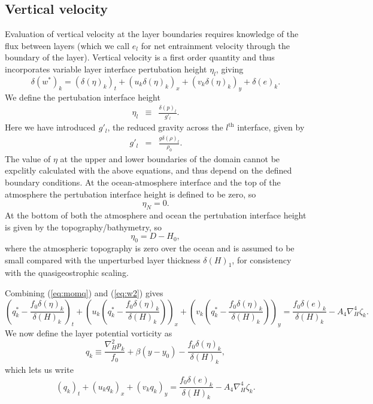 \documentclass[11pt, a4paper,twoside]{article}
\newcommand{\rhb}[1]{{{}^{#1}\rho}}
\newcommand{\gp}[2]{{}^{#1}g'_{#2}}
\numberwithin{equation}{section}
\begin{document}
\subsection{Vertical velocity}
Evaluation of vertical velocity at the layer boundaries requires knowledge of the flux between layers (which we call $e_l$ for net entrainment velocity through the boundary of the layer).
Vertical velocity is a first order quantity and thus incorporates variable layer interface pertubation height $\eta_l$, giving
\begin{equation}\label{eq:w2}
\delta\left(w^*\right)_k =  \left(\delta(\eta)_k\right)_t + \left(u_k \delta(\eta)_k\right)_x + \left(v_{k} \delta(\eta)_k\right)_y + \delta(e)_k.
\end{equation}
We define the pertubation interface height
\begin{eqnarray}
\eta_{l} & \equiv &  \frac{\delta(p)_l}{\gp{}{l}}\label{eq:eta1}.
\end{eqnarray}
Here we have introduced $\gp{}{l}$, the reduced gravity across the $l^\textrm{th}$ interface, given by
\begin{eqnarray}
\gp{}{l}   & = & \frac{g\delta(\rho)_l}{\rhb{}_0}.
\end{eqnarray}
The value of $\eta$ at the upper and lower boundaries of the domain cannot be expclitly calculated with the above equations, and thus depend on the defined boundary conditions.
At the ocean-atmosphere interface and the top of the atmosphere the pertubation interface height is defined to be zero, so
\begin{equation}
\eta_N = 0.
\end{equation}
At the bottom of both the atmosphere and ocean the pertubation interface height is given by the topography/bathymetry, so
\begin{equation}
\eta_0 = D - H_0,
\end{equation}
where the atmospheric topography is zero over the ocean and is assumed to be small compared with the unperturbed layer thickness $\delta(H)_1$, for consistency with the quasigeostrophic scaling.

Combining (\ref{eq:momq}) and (\ref{eq:w2}) gives
\begin{equation}
\left(q^*_k - \frac{f_0\delta(\eta)_k}{\delta(H)_k}\right)_t  + \left(u_k \left(q^*_k - \frac{f_0\delta(\eta)_k}{\delta(H)_k}\right)\right)_x  + \left(v_k\left(q^*_k -\frac{f_0\delta(\eta)_k}{\delta(H)_k}\right)\right)_y  = \frac{f_0 \delta(e)_k}{\delta(H)_k} - A_4\nabla_H^4\zeta_k.
\end{equation}
We now define the layer potential vorticity as
\begin{equation}\label{eq:layerpv}
q_k \equiv \frac{\nabla_H^2 p_k}{f_0} + \beta(y - y_0) - \frac{f_0\delta(\eta)_k}{\delta(H)_k},
\end{equation}
which lets us write
\begin{equation}\label{eq:dynamic}
\left(q_k\right)_t  + \left(u_kq_k\right)_x  + \left(v_kq_k\right)_y  = \frac{f_0 \delta(e)_k}{\delta(H)_{k}} - A_4\nabla_H^4\zeta_k.
\end{equation}
\end{document}
